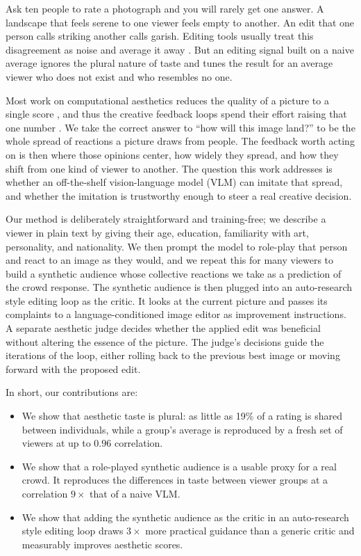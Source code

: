 \documentclass{article}
\begin{document}
Ask ten people to rate a photograph and you will rarely get one answer. A landscape that feels serene to one viewer feels empty to another. An edit that one person calls striking another calls garish. Editing tools usually treat this disagreement as noise and average it away \citep{murray2012ava, schuhmann2022, xu2023imagereward, kirstain2023pickapic}. But an editing signal built on a naive average ignores the plural nature of taste \citep{uma2021, plank2022} and tunes the result for an average viewer who does not exist and who resembles no one.

Most work on computational aesthetics reduces the quality of a picture to a single score \citep{murray2012ava, ke2023vila, wu2024qalign}, and thus the creative feedback loops spend their effort raising that one number \citep{black2024ddpo, wallace2024dpo}. We take the correct answer to ``how will this image land?'' to be the whole spread of reactions a picture draws from people. The feedback worth acting on is then where those opinions center, how widely they spread, and how they shift from one kind of viewer to another. The question this work addresses is whether an off-the-shelf vision-language model (VLM) can imitate that spread, and whether the imitation is trustworthy enough to steer a real creative decision.

Our method is deliberately straightforward and training-free; we describe a viewer in plain text by giving their age, education, familiarity with art, personality, and nationality. We then prompt the model to role-play that person and react to an image as they would, and we repeat this for many viewers to build a synthetic audience whose collective reactions we take as a prediction of the crowd response. The synthetic audience is then plugged into an auto-research style editing loop as the critic. It looks at the current picture and passes its complaints to a language-conditioned image editor as improvement instructions. A separate aesthetic judge decides whether the applied edit was beneficial without altering the essence of the picture. The judge's decisions guide the iterations of the loop, either rolling back to the previous best image or moving forward with the proposed edit.

In short, our contributions are:

\begin{itemize}[leftmargin=1.4em, itemsep=2pt, topsep=2pt, parsep=0pt]
\item We show that aesthetic taste is plural: as little as 19\% of a rating is shared between individuals, while a group's average is reproduced by a fresh set of viewers at up to $0.96$ correlation.

\item We show that a role-played synthetic audience is a usable proxy for a real crowd. It reproduces the differences in taste between viewer groups at a correlation $9\times$ that of a naive VLM.

\item We show that adding the synthetic audience as the critic in an auto-research style editing loop draws $3\times$ more practical guidance than a generic critic and measurably improves aesthetic scores.
\end{itemize}
\end{document}
